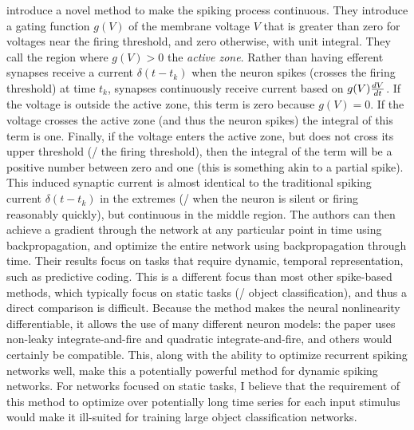 \textcite{Huh2017} introduce a novel method
to make the spiking process continuous.
They introduce a gating function $g(V)$ of the membrane voltage $V$
that is greater than zero for voltages near the firing threshold,
and zero otherwise, with unit integral.
They call the region where $g(V) > 0$ the \emph{active zone}.
Rather than having efferent synapses receive a current $\delta(t - t_k)$
when the neuron spikes (crosses the firing threshold) at time $t_k$,
synapses continuously receive current based on $g(V) \frac{dV}{dt}$.
If the voltage is outside the active zone, this term is zero because $g(V) = 0$.
If the voltage crosses the active zone (and thus the neuron spikes)
the integral of this term is one.
Finally, if the voltage enters the active zone,
but does not cross its upper threshold (\ie/ the firing threshold),
then the integral of the term will be a positive number between zero and one
(this is something akin to a partial spike).
This induced synaptic current is almost identical
to the traditional spiking current $\delta(t - t_k)$ in the extremes
(\ie/ when the neuron is silent or firing reasonably quickly),
but continuous in the middle region.
The authors can then achieve a gradient through the network
at any particular point in time using backpropagation,
and optimize the entire network using backpropagation through time.
Their results focus on tasks that require dynamic, temporal representation,
such as predictive coding.
This is a different focus than most other spike-based methods,
which typically focus on static tasks (\ie/ object classification),
and thus a direct comparison is difficult.
Because the method makes the neural nonlinearity differentiable,
it allows the use of many different neuron models:
the paper uses non-leaky integrate-and-fire and
quadratic integrate-and-fire,
and others would certainly be compatible.
This, along with the ability to optimize recurrent spiking networks well,
make this a potentially powerful method for dynamic spiking networks.
For networks focused on static tasks,
I believe that the requirement of this method to optimize over
potentially long time series for each input stimulus
would make it ill-suited for training large object classification networks.

